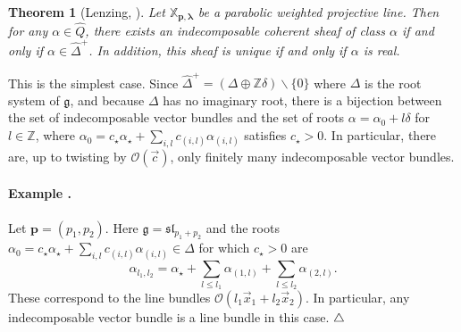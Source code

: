 \documentclass[a4paper,10pt]{amsart}
\def\Z{\mathbb{Z}}
\def\endexample{$\hfill \triangle$}
\def\a{\alpha}
\def\O{\mathcal{O}}
\def\p{\mathbf{p}}
\def\g{\mathfrak{g}}
\def\xpl{\mathbb{X}_{\mathbf{p},\boldsymbol{\lambda}}}
\newtheorem{theo}{\bf{Theorem}}[section]
\numberwithin{equation}{section}
\begin{document}
{\vspace{.1in}

\begin{theo}[Lenzing, \cite{Lenzing1}]\label{T:LL} Let $\xpl$ be a parabolic weighted projective line. Then for any $\a \in \widehat{Q}$, there exists an indecomposable coherent sheaf of class $\a$ if and only if $\a \in \widehat{\Delta}^+$. In addition, this sheaf is unique if and only if $\a$ is real.
\end{theo}

\vspace{.1in}

This is the simplest case. Since $\widehat{\Delta}^+=(\Delta \oplus \Z\delta)\backslash \{0\}$ where $\Delta$ is the root system of $\g$, and because $\Delta$ has no imaginary root, there is a bijection between the set of indecomposable vector bundles and the set of roots $\a=\a_0+l\delta$ for $l \in \Z$, where $\a_0=c_{\star}\a_{\star} +\sum_{i,l} c_{(i,l)}\a_{(i,l)}$ satisfies $c_{\star}>0$. In particular, there are, up to twisting by $\O(\vec{c})$, only finitely many indecomposable vector bundles.

\vspace{.15in}

\addtocounter{theo}{1}
\paragraph{\textbf{Example \thetheo.}} Let $\p=(p_1,p_2)$. Here $\g=\mathfrak{sl}_{p_1+p_2}$ and the roots $\a_0= c_{\star}\a_{\star} +\sum_{i,l} c_{(i,l)}\a_{(i,l)}\in \Delta$ for which $c_{\star}>0$ are
$$\a_{l_1,l_2}=\a_{\star}+\sum_{l \leq l_1} \a_{(1,l)} + \sum_{l \leq l_2} \a_{(2,l)}.$$
These correspond to the line bundles $\O(l_1\vec{x}_1+l_2\vec{x}_2)$. In particular, any indecomposable vector bundle is a line bundle in this case.
\endexample

\vspace{.15in}

\addtocounter{theo}{1}
}
\end{document}
